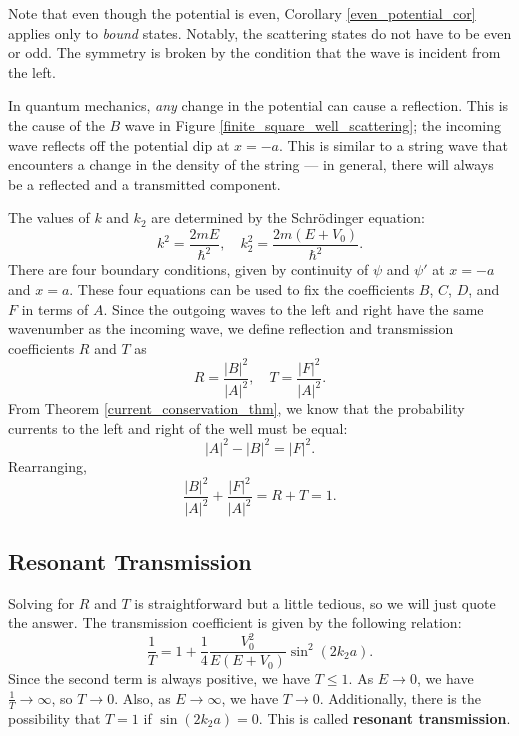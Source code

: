 \begin{framedrmk*}
    Note that even though the potential is even, Corollary \ref{even_potential_cor} applies only to \textit{bound} states. Notably, the scattering states do not have to be even or odd. The symmetry is broken by the condition that the wave is incident from the left.
\end{framedrmk*}

\begin{framedrmk*}
    In quantum mechanics, \textit{any} change in the potential can cause a reflection. This is the cause of the $B$ wave in Figure \ref{finite_square_well_scattering}; the incoming wave reflects off the potential dip at $x=-a$. This is similar to a string wave that encounters a change in the density of the string --- in general, there will always be a reflected and a transmitted component.
\end{framedrmk*}

The values of $k$ and $k_2$ are determined by the Schrödinger equation: $$k^2=\frac{2mE}{\hbar^2},\quad k_2^2=\frac{2m(E+V_0)}{\hbar^2}.$$There are four boundary conditions, given by continuity of $\psi$ and $\psi'$ at $x=-a$ and $x=a$. These four equations can be used to fix the coefficients $B$, $C$, $D$, and $F$ in terms of $A$. Since the outgoing waves to the left and right have the same wavenumber as the incoming wave, we define reflection and transmission coefficients $R$ and $T$ as $$R=\frac{|B|^2}{|A|^2},\quad T=\frac{|F|^2}{|A|^2}.$$From Theorem \ref{current_conservation_thm}, we know that the probability currents to the left and right of the well must be equal: $$|A|^2-|B|^2=|F|^2.$$Rearranging, $$\frac{|B|^2}{|A|^2}+\frac{|F|^2}{|A|^2}=R+T=1.$$

\subsection{Resonant Transmission}\label{resonant_transmission}

Solving for $R$ and $T$ is straightforward but a little tedious, so we will just quote the answer. The transmission coefficient is given by the following relation: $$\frac{1}{T}=1+\frac{1}{4}\frac{V_0^2}{E(E+V_0)}\sin^2(2k_2a).$$Since the second term is always positive, we have $T\leq 1$. As $E\to 0$, we have $\frac{1}{T}\to\infty$, so $T\to 0$. Also, as $E\to\infty$, we have $T\to 0$. Additionally, there is the possibility that $T=1$ if $\sin(2k_2a)=0$. This is called \textbf{resonant transmission}.

